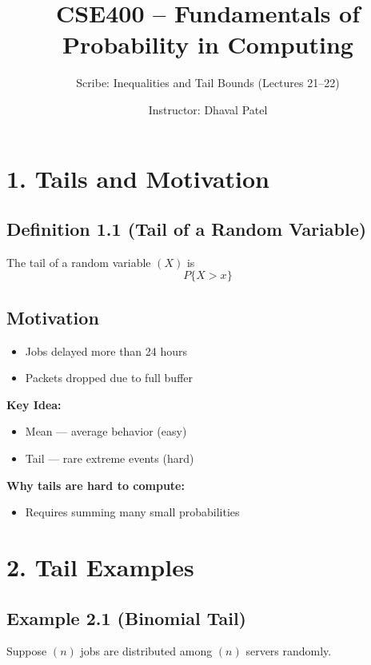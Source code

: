 \documentclass[11pt]{article}
\title{CSE400 – Fundamentals of Probability in Computing}
\author{Scribe: Inequalities and Tail Bounds (Lectures 21–22)}
\date{Instructor: Dhaval Patel}
\begin{document}
\maketitle

\section*{1. Tails and Motivation}

\subsection*{Definition 1.1 (Tail of a Random Variable)}

The tail of a random variable $( X )$ is
\[
P\{X > x\}
\]

\subsection*{Motivation}

\begin{itemize}
\item Jobs delayed more than 24 hours
\item Packets dropped due to full buffer
\end{itemize}

\textbf{Key Idea:}

\begin{itemize}
\item Mean — average behavior (easy)
\item Tail — rare extreme events (hard)
\end{itemize}

\textbf{Why tails are hard to compute:}

\begin{itemize}
\item Requires summing many small probabilities
\end{itemize}

\section*{2. Tail Examples}

\subsection*{Example 2.1 (Binomial Tail)}

Suppose $( n )$ jobs are distributed among $( n )$ servers randomly.
\end{document}
